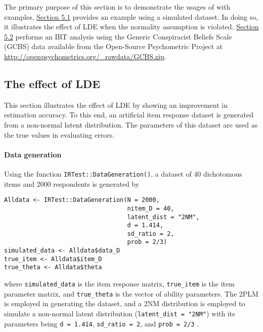 The primary purpose of this section is to demonstrate the usages of
 with examples. \protect\hyperlink{the-effect-of-the-lde}{Section 5.1}
provides an example using a simulated dataset. In doing so, it
illustrates the effect of LDE when the normality assumption is violated.
\protect\hyperlink{an-empirical-example}{Section 5.2} performs an IRT analysis using
the Generic Conspiracist Beliefs Scale (GCBS) data \citep{GCBS} available from
the Open-Source Psychometric Project at
\url{http://openpsychometrics.org/_rawdata/GCBS.zip}.

\hypertarget{the-effect-of-the-lde}{%
\subsection{The effect of LDE}\label{the-effect-of-the-lde}}

This section illustrates the effect of LDE by showing an improvement
in estimation accuracy. To this end, an artificial item response dataset is
generated from a non-normal latent distribution. The parameters of this
dataset are used as the true values in evaluating errors.

\hypertarget{data-generation}{%
\paragraph{Data generation}\label{data-generation}}

Using the function \texttt{IRTest::DataGeneration()}, a dataset of 40 dichotomous items
and 2000 respondents is generated by

\begin{verbatim}
Alldata <- IRTest::DataGeneration(N = 2000,
                                  nitem_D = 40,
                                  latent_dist = "2NM",
                                  d = 1.414,
                                  sd_ratio = 2,
                                  prob = 2/3)
simulated_data <- Alldata$data_D
true_item <- Alldata$item_D
true_theta <- Alldata$theta
\end{verbatim}

where \texttt{simulated\_data} is the item response matrix, \texttt{true\_item} is the
item parameter matrix, and \texttt{true\_theta} is the vector of ability
parameters. The 2PLM is employed in generating the dataset, and
a 2NM distribution is employed to simulate a non-normal latent
distribution (\texttt{latent\_dist\ =\ "2NM"}) with its parameters being \texttt{d\ =\ 1.414},
\texttt{sd\_ratio\ =\ 2}, and \texttt{prob\ =\ 2/3} \citep[for the reparameterization of the 2NM, see][]{Li:2021, IRTest}.

